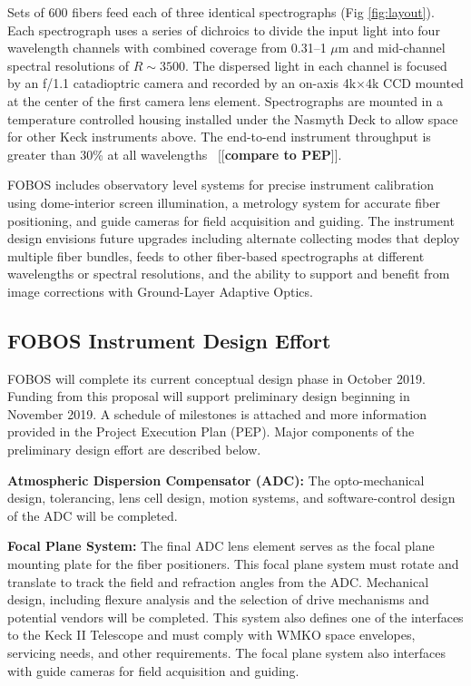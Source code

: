 \documentclass[oneside,11pt]{amsart}
\newcommand{\comment}[2][todo]{{\color{#1}[[{\bf #2}]]}}
\begin{document}
Sets of 600 fibers feed each of three identical spectrographs (Fig
\ref{fig:layout}).  Each spectrograph uses a series of dichroics to
divide the input light into four wavelength channels with combined
coverage from 0.31--1 $\mu$m and mid-channel spectral resolutions of $R
\sim 3500$.  The dispersed light in each channel is focused by an f/1.1
catadioptric camera and recorded by an on-axis 4k$\times$4k CCD mounted
at the center of the first camera lens element.  Spectrographs are
mounted in a temperature controlled housing installed under the Nasmyth
Deck to allow space for other Keck instruments above.  The end-to-end
instrument throughput is greater than 30\% at all wavelengths
~\comment{compare to PEP}.

FOBOS includes observatory level systems for precise instrument
calibration using dome-interior screen illumination, a metrology system
for accurate fiber positioning, and guide cameras for field acquisition
and guiding.  The instrument design envisions future upgrades including
alternate collecting modes that deploy multiple fiber bundles, feeds to
other fiber-based spectrographs at different wavelengths or spectral
resolutions, and the ability to support and benefit from image
corrections with Ground-Layer Adaptive Optics.

\subsection{FOBOS Instrument Design Effort}
\label{sec:design}

FOBOS will complete its current conceptual design phase in October 2019.
Funding from this proposal will support preliminary design beginning in
November 2019.  A schedule of milestones is attached and more
information provided in the Project Execution Plan (PEP).  Major
components of the preliminary design effort are described below.

\noindent \textbf{Atmospheric Dispersion Compensator (ADC):} The
opto-mechanical design, tolerancing, lens cell design, motion systems,
and software-control design of the ADC will be completed.  

\noindent \textbf{Focal Plane System:} The final ADC lens element serves
as the focal plane mounting plate for the fiber positioners.  This focal
plane system must rotate and translate to track the field and refraction
angles from the ADC.  Mechanical design, including flexure analysis and
the selection of drive mechanisms and potential vendors will be
completed.  This system also defines one of the interfaces to the Keck
II Telescope and must comply with WMKO space envelopes, servicing needs,
and other requirements.  The focal plane system also interfaces with
guide cameras for field acquisition and guiding.
\end{document}
